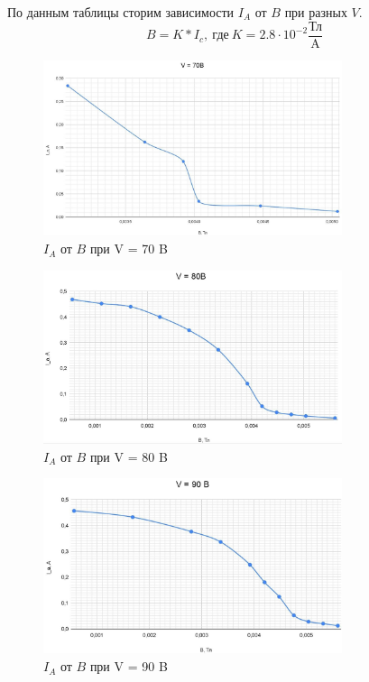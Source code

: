 \documentclass[a4paper]{article}
\begin{document}
По данным таблицы сторим зависимости $I_A$ от $B$ при разных $V$.
\[B = K * I_c,~\text{где}~K = 2.8 \cdot10^{-2}\frac{\text{Тл}}{\text{A}}\]

\begin{figure}[h]
	\begin{center}
		\includegraphics[width = 0.78\textwidth]{V70B}
		\caption{$I_A$ от $B$ при V = 70 B}
	\end{center}
\end{figure}

\begin{figure}[h]
	\begin{center}
		\includegraphics[width = 0.78\textwidth]{V80B}
		\caption{$I_A$ от $B$ при V = 80 B}
	\end{center}
\end{figure}

\begin{figure}[h]
	\begin{center}
		\includegraphics[width = 0.78\textwidth]{V90B}
		\caption{$I_A$ от $B$ при V = 90 B}
	\end{center}
\end{figure}
\end{document}
